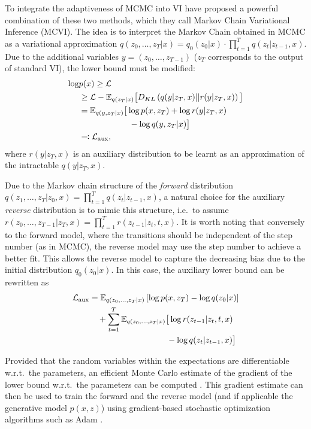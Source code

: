 To integrate the adaptiveness of MCMC into VI \textcite{Salimans2014} have proposed a powerful combination of these two methods, which they call Markov Chain Variational Inference (MCVI). The idea is to interpret the Markov Chain obtained in MCMC as a variational approximation $q(z_0, \dots, z_T|x) = q_{0}(z_0|x) \cdot \prod_{t=1}^T q(z_t|z_{t-1}, x)$. Due to the additional variables $y = (z_0, \dots, z_{T-1})$ ($z_T$ corresponds to the output of standard VI), the lower bound must be modified:
\begin{equation}
\begin{split}
\log &p(x) \geq \mathcal{L} \\
	   &\geq \mathcal{L} - \mathbb{E}_{q(z_T|x)} \big[ D_{KL} \left( q(y |z_T, x) || r(y|z_T, x) \right) \big] \\
	   &=  \mathbb{E}_{q(y, z_T|x)} \big[ \log p(x, z_T) + \log r(y |z_T, x) \\
	   &\qquad\qquad\qquad  - \log q(y, z_{T} |x) \big] \\
	   &\eqqcolon \mathcal{L}_{\textrm{aux}},
\end{split}
\end{equation}
where $r(y|z_T, x)$ is an auxiliary distribution to be learnt as an approximation of the intractable $q(y |z_T, x)$. 

Due to the Markov chain structure of the \textit{forward} distribution $q(z_1, \dots, z_T|z_0, x) = \prod_{t=1}^T q(z_t|z_{t-1}, x)$, a natural choice for the auxiliary \textit{reverse} distribution is to mimic this structure, i.e.\ to assume $r(z_0, \dots, z_{T-1} |z_T, x) = \prod_{t=1}^T r(z_{t-1}|z_t, t, x)$. It is worth noting that conversely to the forward model, where the transitions should be independent of the step number (as in MCMC), the reverse model may use the step number to achieve a better fit. This allows the reverse model to capture the decreasing bias due to the initial distribution $q_0(z_0|x)$. In this case, the auxiliary lower bound can be rewritten as
\begin{equation} \label{eq:MCVIAuxLowerBound}
\begin{split}
\mathcal{L}_{\textrm{aux}} &= \mathbb{E}_{q(z_0, \dots, z_T|x)} \left[ \log p(x, z_T) - \log q(z_0|x) \right] \\
& \quad + \sum_{t=1}^T \mathbb{E}_{q(z_0, \dots, z_T|x)} \big[ \log r(z_{t-1}|z_t, t, x) \\
& \quad\qquad\qquad\qquad\qquad\; - \log q(z_t|z_{t-1}, x)  \big] 
\end{split}
\end{equation}

Provided that the random variables within the expectations are differentiable w.r.t.\ the parameters, an efficient Monte Carlo estimate of the gradient of the lower bound w.r.t.\ the parameters can be computed \parencite{Kingma2014, Rezende2014}. This gradient estimate can then be used to train the forward and the reverse model (and if applicable the generative model $p(x, z)$) using gradient-based stochastic optimization algorithms such as Adam \parencite{Kingma2015}.
